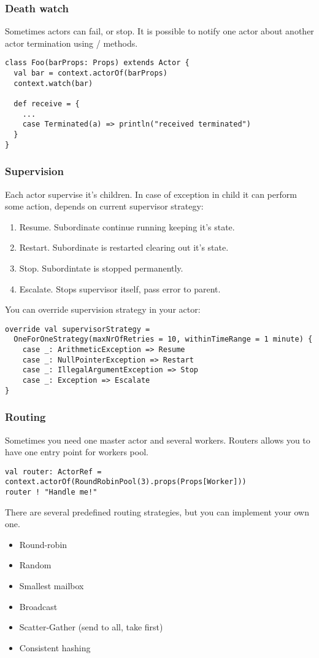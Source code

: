 \documentclass{beamer}
\begin{document}
\begin{frame}[fragile]
\frametitle{Death watch}
Sometimes actors can fail, or stop. It is possible to notify one actor about another actor
termination using  /  methods.
\begin{lstlisting}
class Foo(barProps: Props) extends Actor {
  val bar = context.actorOf(barProps)
  context.watch(bar)

  def receive = {
    ...
    case Terminated(a) => println("received terminated")
  }
}
\end{lstlisting}
\end{frame}

\begin{frame}[fragile]
\frametitle{Supervision}
Each actor supervise it's children.  In case of exception in child it can perform some action,
depends on current supervisor strategy:
\begin{enumerate}
\item Resume. Subordinate continue running keeping it's state.
\item Restart. Subordinate is restarted clearing out it's state.
\item Stop. Subordintate is stopped permanently.
\item Escalate. Stops supervisor itself, pass error to parent.
\end{enumerate}
You can override supervision strategy in your actor:
\begin{lstlisting}
override val supervisorStrategy =
  OneForOneStrategy(maxNrOfRetries = 10, withinTimeRange = 1 minute) {
    case _: ArithmeticException => Resume
    case _: NullPointerException => Restart
    case _: IllegalArgumentException => Stop
    case _: Exception => Escalate
}
\end{lstlisting}
\end{frame}

\begin{frame}[fragile]
\frametitle{Routing}
Sometimes you need one master actor and several workers.  Routers allows you to have one
entry point for workers pool.
\begin{lstlisting}
val router: ActorRef = context.actorOf(RoundRobinPool(3).props(Props[Worker]))
router ! "Handle me!"
\end{lstlisting}
There are several predefined routing strategies, but you can implement your own one.
\begin{itemize}
\item Round-robin
\item Random
\item Smallest mailbox
\item Broadcast
\item Scatter-Gather (send to all, take first)
\item Consistent hashing
\end{itemize}
\end{frame}
\end{document}
